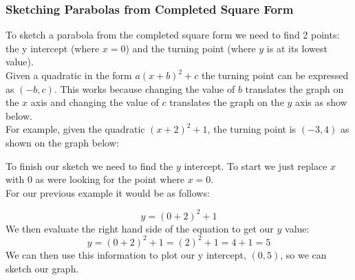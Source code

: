 \documentclass{article}
\begin{document}
\subsubsection{Sketching Parabolas from Completed Square Form}
To sketch a parabola from the completed square form we need to find 2 points: the y intercept (where $x=0$) and the turning point
(where $y$ is at its lowest value).
\\
Given a quadratic in the form $a(x+b)^2+c$ the turning point can be expressed as $(-b, c)$. This works because changing the
value of $b$ translates the graph on the $x$ axis and changing the value of $c$ translates the graph on the $y$ axis as show
below.
\\
For example, given the quadratic $(x + 2)^2 + 1$, the turning point is $(-3, 4)$ as shown on the graph below:

\begin{center}
\end{center}
To finish our sketch we need to find the $y$ intercept. To start we just replace $x$ with $0$ as were looking for the
point where $x=0$.
\\
For our previous example it would be as follows:

\begin{equation}
	y = (0 + 2)^2 + 1
\end{equation}
We then evaluate the right hand side of the equation to get our $y$ value:
\begin{equation}
	y = (0 + 2)^2 + 1 = (2)^2 + 1 = 4 + 1 = 5
\end{equation}
We can then use this information to plot our y intercept, $(0, 5)$, so we can sketch our graph.

\begin{center}
\end{center}
\break
\end{document}
